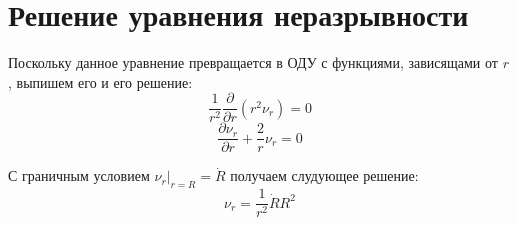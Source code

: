 \section{Решение уравнения неразрывности}
\par Поскольку данное уравнение превращается в ОДУ с функциями, зависящами от $r$, выпишем его и его решение:
$$\frac{1}{r^{2}}\frac{\partial}{\partial r}\left(r^{2}\nu_{r}\right)=0$$
$$\frac{\partial \nu_{r}}{\partial r}+\frac{2}{r}\nu_{r}=0$$
\par С граничным условием $\left.\nu_{r}\right|_{r=R}=\dot{R}$ получаем слудующее решение:
$$\nu_{r}=\frac{1}{r^{2}}\dot{R}R^{2}$$